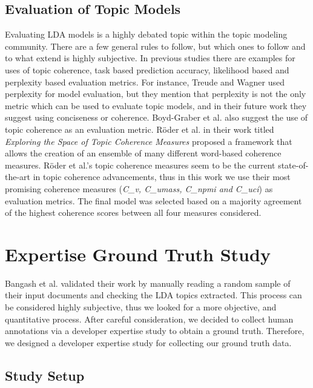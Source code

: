     \subsection{Evaluation of Topic Models} \label{evaluationMetric}
    
        Evaluating LDA models is a highly debated topic within the topic modeling community. There are a few general rules to follow, but which ones to follow and to what extend is highly subjective. In previous studies there are examples for uses of topic coherence, task based prediction accuracy, likelihood based and perplexity based evaluation metrics. For instance, Treude and Wagner \cite{treude2019predicting} used perplexity for model evaluation, but they mention that perplexity is not the only metric which can be used to evaluate topic models, and in their future work they suggest using conciseness or coherence. Boyd-Graber et al. \cite{boyd2014care} also suggest the use of topic coherence as an evaluation metric. R{\"o}der et al. \cite{roder2015exploring} in their work titled \textit{Exploring the Space of Topic Coherence Measures} proposed a framework that allows the creation of an ensemble of many different word-based coherence measures. R{\"o}der et al.'s topic coherence measures seem to be the current state-of-the-art in topic coherence advancements, thus in this work  we use their most promising coherence measures (\emph{C\_v, C\_umass, C\_npmi and C\_uci}) as evaluation metrics. The final model was selected based on a majority agreement of the highest coherence scores between all four measures considered.
    
    \section{Expertise Ground Truth Study} \label{sec:expertise_survey}
    
        Bangash et al. \cite{bangash2019developers} validated their work by manually reading a random sample of their input documents and checking the LDA topics extracted. This process can be considered highly subjective, thus we looked for a more objective, and quantitative process. After careful consideration, we decided to collect human annotations via a developer expertise study to obtain a ground truth. Therefore, we designed a developer expertise study for collecting our ground truth data. 
    
        \subsection{Study Setup}
        
